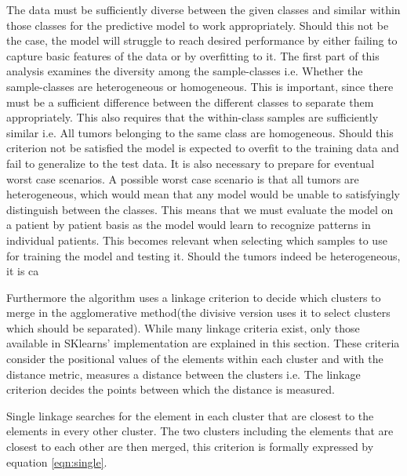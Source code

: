 The data must be sufficiently diverse between the given classes and similar within those classes for the predictive model to work appropriately. Should this not be the case, the model will struggle to reach desired performance by either failing to capture basic features of the data or by overfitting to it. The first part of this analysis examines the diversity among the sample-classes i.e. Whether the sample-classes are heterogeneous or homogeneous. This is important, since there must be a sufficient difference between the different classes to separate them appropriately. This also requires that the within-class samples are sufficiently similar i.e. All tumors belonging to the same class are homogeneous. Should this criterion not be satisfied the model is expected to overfit to the training data and fail to generalize to the test data. It is also necessary to prepare for eventual worst case scenarios. A possible worst case scenario is that all tumors are heterogeneous, which would mean that any model would be unable to satisfyingly distinguish between the classes. This means that we must evaluate the model on a patient by patient basis as the model would learn to recognize patterns in individual patients. This becomes relevant when selecting which samples to use for training the model and testing it. Should the tumors indeed be heterogeneous, it is ca  



Furthermore the algorithm uses a linkage criterion to decide which clusters to merge in the agglomerative method(the divisive version uses it to select clusters which should be separated). While many linkage criteria exist, only those available in SKlearns' implementation are explained in this section\cite{scikit}. These criteria consider the positional values of the elements within each cluster and with the distance metric, measures a distance between the clusters i.e. The linkage criterion decides the points between which the distance is measured.

Single linkage searches for the element in each cluster that are closest to the elements in every other cluster. The two clusters including the elements that are closest to each other are then merged, this criterion is formally expressed by equation \ref{eqn:single}.